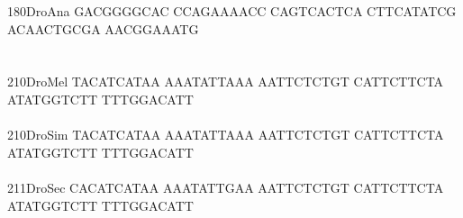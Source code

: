 \documentclass[11pt,twoside,reqno,a4paper]{article}
\begin{document}
{180\hspace*{1\charwidth}DroAna	GACGGGGCAC	CCAGAAAACC	CAGTCACTCA	CTTCATATCG	ACAACTGCGA	AACGGAAATG	\\
\hspace*{4\charwidth}\hspace*{7\charwidth}\hspace*{1\charwidth}\hspace*{1\charwidth}\hspace*{1\charwidth}\hspace*{1\charwidth}\hspace*{1\charwidth}\hspace*{1\charwidth}\\
\\
210\hspace*{1\charwidth}DroMel	TACATCATAA	AAATATTAAA	AATTCTCTGT	CATTCTTCTA	ATATGGTCTT	TTTGGACATT	\\
\hspace*{4\charwidth}\hspace*{7\charwidth}\hspace*{1\charwidth}\hspace*{1\charwidth}\hspace*{1\charwidth}\hspace*{1\charwidth}\hspace*{1\charwidth}\hspace*{1\charwidth}\\
210\hspace*{1\charwidth}DroSim	TACATCATAA	AAATATTAAA	AATTCTCTGT	CATTCTTCTA	ATATGGTCTT	TTTGGACATT	\\
\hspace*{4\charwidth}\hspace*{7\charwidth}\hspace*{1\charwidth}\hspace*{1\charwidth}\hspace*{1\charwidth}\hspace*{1\charwidth}\hspace*{1\charwidth}\hspace*{1\charwidth}\\
211\hspace*{1\charwidth}DroSec	CACATCATAA	AAATATTGAA	AATTCTCTGT	CATTCTTCTA	ATATGGTCTT	TTTGGACATT	\\
\hspace*{4\charwidth}\hspace*{7\charwidth}\hspace*{1\charwidth}\hspace*{1\charwidth}\hspace*{1\charwidth}\hspace*{1\charwidth}\hspace*{1\charwidth}\hspace*{1\charwidth}\\
}
\end{document}
